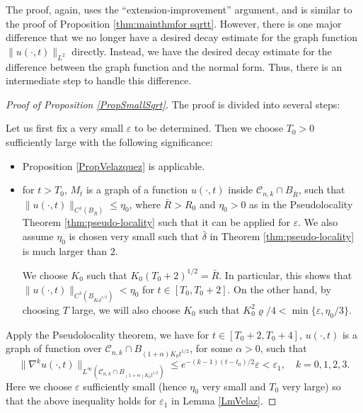 \documentclass[11pt]{amsart}
\numberwithin{equation}{section}
\numberwithin{equation}{section}
\newcommand{\eps}{\varepsilon}
\newcommand{\cC}{\mathcal{C}}
\begin{document}
	The proof, again, uses the ``extension-improvement'' argument, and is similar to the proof of Proposition \ref{thm:mainthmfor sqrtt}. However, there is one major difference that we no longer have a desired decay estimate for the graph function $\|u(\cdot,t)\|_{L^2}$ directly. Instead, we have the desired decay estimate for the difference between the graph function and the normal form. Thus, there is an intermediate step to handle this difference.
	
	\begin{proof}[Proof of Proposition \ref{PropSmallSqrt}]
		The proof is divided into several steps:
		
		 Let us first fix a very small $\eps$ to be determined. Then we choose $T_0>0$ sufficiently large with the following significance: 
		\begin{itemize}
			\item Proposition \ref{PropVelazquez} is applicable.
			\item for $t>T_0$, $M_t$ is a graph of a function $u(\cdot,t)$ inside $\cC_{n,k}\cap B_{\bar R}$, such that $\|u(\cdot,t)\|_{C^1(B_{\bar R})}\leq \eta_0$, where $\bar R>R_0$ and $\eta_0>0$ as in the Pseudolocality Theorem \ref{thm:pseudo-locality} such that it can be applied for $\eps$. We also assume $\eta_0$ is chosen very small such that $\bar\delta$ in Theorem \ref{thm:pseudo-locality} is much larger than $2$. 
			
			We choose $K_0$ such that $K_0(T_0+2)^{1/2}=\bar R$. In particular, this shows that $\|u(\cdot,t)\|_{C^1(B_{K_0t^{1/2}})}<\eta_0$ for $t\in[T_0,T_0+2]$. On the other hand, by choosing $T$ large, we will also choose $K_0$ such that $K_0^2\varrho/4<\min\{\eps,\eta_0/3\}$.
		\end{itemize}
		
		Apply the Pseudolocality theorem, we have for $t\in[T_0+2,T_0+4]$, $u(\cdot,t)$ is a graph of function over $\cC_{n,k}\cap B_{(1+\alpha)K_0t^{1/2}}$, for some $\alpha>0$, such that $$\|\nabla^ku(\cdot,t)\|_{L^\infty(\cC_{n,k}\cap B_{(1+\alpha)K_0t^{1/2}})}\leq  e^{-(k-1)(t-t_0)/2}\eps<\eps_1, \quad k=0,1,2,3.$$ 
		Here we choose $\eps$ sufficiently small (hence $\eta_0$ very small and $T_0$ very large) so that the above inequality holds for $\eps_1$ in Lemma \ref{LmVelaz}. 
		

\end{proof}
\end{document}
